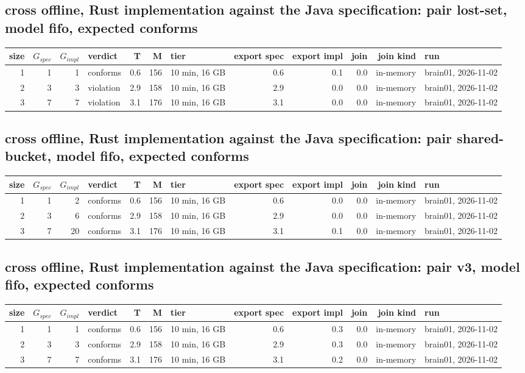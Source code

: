 \documentclass[10pt]{article}
\begin{document}
\subsection*{cross offline, Rust implementation against the Java specification: pair \textsf{lost-set}, model fifo, expected conforms}
\begin{longtable}{@{}rrrlrrlrrrrl@{}}
\toprule
size & $G_{\mathit{spec}}$ & $G_{\mathit{impl}}$ & verdict & T & M & tier & export spec & export impl & join & join kind & run \\
\midrule
\endhead
\color{red} 1 & 1 & 1 & conforms & 0.6 & 156 & 10 min, 16 GB & 0.6 & 0.1 & 0.0 & in-memory & brain01, 2026-11-02 \\
\color{red} 2 & 3 & 3 & violation & 2.9 & 158 & 10 min, 16 GB & 2.9 & 0.0 & 0.0 & in-memory & brain01, 2026-11-02 \\
\color{red} 3 & 7 & 7 & violation & 3.1 & 176 & 10 min, 16 GB & 3.1 & 0.0 & 0.0 & in-memory & brain01, 2026-11-02 \\
\bottomrule
\end{longtable}
\subsection*{cross offline, Rust implementation against the Java specification: pair \textsf{shared-bucket}, model fifo, expected conforms}
\begin{longtable}{@{}rrrlrrlrrrrl@{}}
\toprule
size & $G_{\mathit{spec}}$ & $G_{\mathit{impl}}$ & verdict & T & M & tier & export spec & export impl & join & join kind & run \\
\midrule
\endhead
\color{red} 1 & 1 & 2 & conforms & 0.6 & 156 & 10 min, 16 GB & 0.6 & 0.0 & 0.0 & in-memory & brain01, 2026-11-02 \\
\color{red} 2 & 3 & 6 & conforms & 2.9 & 158 & 10 min, 16 GB & 2.9 & 0.0 & 0.0 & in-memory & brain01, 2026-11-02 \\
\color{red} 3 & 7 & 20 & conforms & 3.1 & 176 & 10 min, 16 GB & 3.1 & 0.1 & 0.0 & in-memory & brain01, 2026-11-02 \\
\bottomrule
\end{longtable}
\subsection*{cross offline, Rust implementation against the Java specification: pair \textsf{v3}, model fifo, expected conforms}
\begin{longtable}{@{}rrrlrrlrrrrl@{}}
\toprule
size & $G_{\mathit{spec}}$ & $G_{\mathit{impl}}$ & verdict & T & M & tier & export spec & export impl & join & join kind & run \\
\midrule
\endhead
\color{red} 1 & 1 & 1 & conforms & 0.6 & 156 & 10 min, 16 GB & 0.6 & 0.3 & 0.0 & in-memory & brain01, 2026-11-02 \\
\color{red} 2 & 3 & 3 & conforms & 2.9 & 158 & 10 min, 16 GB & 2.9 & 0.3 & 0.0 & in-memory & brain01, 2026-11-02 \\
\color{red} 3 & 7 & 7 & conforms & 3.1 & 176 & 10 min, 16 GB & 3.1 & 0.2 & 0.0 & in-memory & brain01, 2026-11-02 \\
\bottomrule
\end{longtable}
\end{document}

